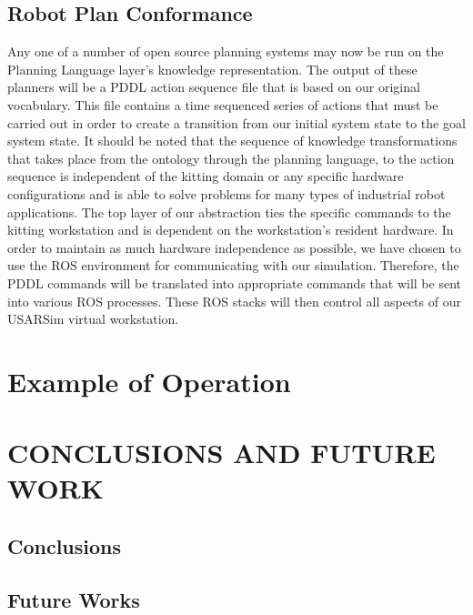 \documentclass[a4paper, 10pt, conference]{ieeeconf}      %
\begin{document}
\subsection{Robot Plan Conformance}
\label{subsect:RobotPlan}
Any one of a number of open source planning systems may now be run on the Planning Language layer's knowledge representation. The output of these planners will be
a PDDL action sequence file that is based on our original vocabulary. This file
contains a time sequenced series of actions that must be carried out in order to create a transition from our initial system state to the goal system state. It should be noted that
the sequence of knowledge transformations that takes place from the ontology through the planning language, to the action sequence is independent of the kitting domain or any specific hardware configurations and is able to solve problems for many types of industrial robot applications.
The top layer of our abstraction ties the specific commands to the kitting workstation and is dependent on the workstation's resident hardware.  In order to maintain as
much hardware independence as possible, we have chosen to use the ROS environment for communicating with our simulation. Therefore, the PDDL commands will
be translated into appropriate commands that will be sent into various ROS processes. These ROS stacks will then control all aspects of our USARSim virtual workstation.

\section{Example of Operation}
\label{sect:Example}




\section{CONCLUSIONS AND FUTURE WORK}
\label{sect:Conclusions}

\subsection{Conclusions}




\subsection{Future Works}



\end{document}
